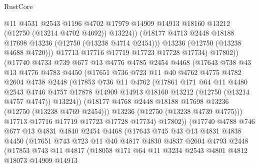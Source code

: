 \begin{lexlean}{RustCore}
\begin{coremodule}
                    @11
                    @4531
                    @2543
                    @1196
                    @4702
                    @17979
                    @14909
                    @14913
                    @18160
                    @13212
                    (@12750 (@13214 @4702 @4692))
                    @13224))
                (@18177 @4713 @2448 @18188 @17698 @13236 (@12750 (@13238 @4714 @2454)))
                @13236
                (@12750 (@13238 @4688 @4720)))
              @17713
              @17716
              @17719
              @17723
              @17728
              @17734)
            @17802))
        (@17740
          @4733
          @739
          @677
          @13
          @4776
          @4785
          @2454
          @4468
          (@17643
            @738
            @43
            @13
            @4776
            @4783
            @4450
            (@17651
              @736
              @723
              @11
              @40
              @4762
              @4775
              @4782
              @2604
              @4738
              @2448
              (@17853
                @736
                @11
                @4762
                (@17861
                  @171
                  @64
                  @11
                  @4480
                  @2543
                  @4746
                  @4757
                  @17878
                  @14909
                  @14913
                  @18160
                  @13212
                  (@12750 (@13214 @4757 @4747))
                  @13224))
              (@18177 @4768 @2448 @18188 @17698 @13236 (@12750 (@13238 @4769 @2454)))
              @13236
              (@12750 (@13238 @4739 @4775)))
            @17713
            @17716
            @17719
            @17723
            @17728
            @17734)
          @17802))
      (@17740
        @4788
        @746
        @677
        @13
        @4831
        @4840
        @2454
        @4468
        (@17643
          @745
          @43
          @13
          @4831
          @4838
          @4450
          (@17651
            @743
            @723
            @11
            @40
            @4817
            @4830
            @4837
            @2604
            @4793
            @2448
            (@17853
              @743
              @11
              @4817
              (@18058
                @171
                @64
                @11
                @3234
                @2543
                @4801
                @4812
                @18073
                @14909
                @14913

\end{coremodule}
\end{lexlean}
